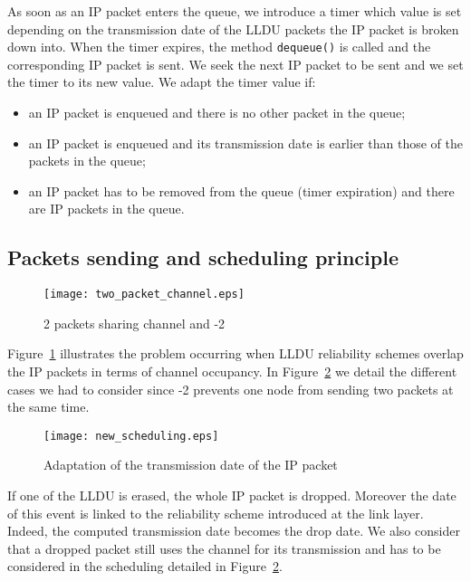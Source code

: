 \documentclass[conference,letterpaper]{IEEEtran}
\begin{document}
As soon as an IP packet enters the queue, we introduce a timer which value is set depending on the transmission date of the LLDU packets the IP packet is broken down into. When the timer expires, the method \texttt{dequeue()} is called and the corresponding IP packet is sent. We seek the next IP packet to be sent and we set the timer to its new value. 
We adapt the timer value if:  
\begin{itemize}
\item an IP packet is enqueued and there is no other packet in the queue;
\item an IP packet is enqueued and its transmission date is earlier than those of the packets in the queue;
\item an IP packet has to be removed from the queue (timer expiration) and there are IP packets in the queue.
\end{itemize}

\subsection{Packets sending and scheduling principle}
\label{subsec::n2_scheduling}

\begin{figure}[h]
    \begin{center}
	\texttt{[image: two\_packet\_channel.eps]}
	\caption{2 packets sharing channel and -2}
	\label{fig::two_packet_channel}
    \end{center}
\end{figure}

Figure~\ref{fig::two_packet_channel} illustrates the problem occurring when LLDU reliability schemes overlap the IP packets in terms of channel occupancy. In Figure~\ref{fig::new_scheduling} we detail the different cases we had to consider since -2 prevents one node from sending two packets at the same time.

\begin{figure}[h]
    \begin{center}
	\texttt{[image: new\_scheduling.eps]}
	\caption{Adaptation of the transmission date of the IP packet}
	\label{fig::new_scheduling}
    \end{center}
\end{figure}

If one of the LLDU is erased, the whole IP packet is dropped. Moreover the date of this event is linked to the reliability scheme introduced at the link layer. Indeed, the computed transmission date becomes the drop date. We also consider that a dropped packet still uses the channel for its transmission and has to be considered in the scheduling detailed in Figure~\ref{fig::new_scheduling}.
\end{document}

